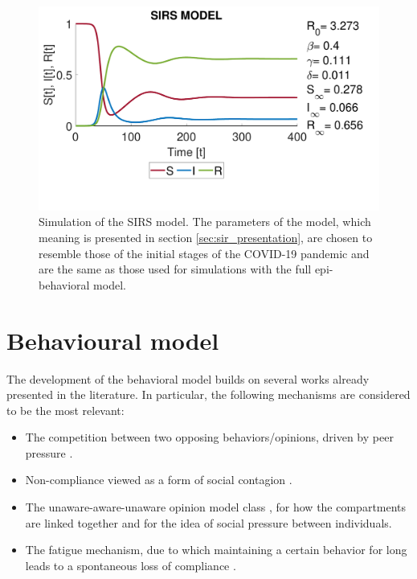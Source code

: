 \begin{figure}[ht]
	\centering
	\includegraphics[width=0.6\linewidth]{1_corpo/figure/r0/sirs_figure}
	\caption[SIRS simulation]{Simulation of the SIRS model. The parameters of the model, which meaning is presented in section \ref{sec:sir_presentation}, are chosen to resemble those of the initial stages of the COVID-19 pandemic \cite{data_R0_covid} and are the same as those used for simulations with the full epi-behavioral model.}
	\label{fig:sirsfigure}
\end{figure}

\section{Behavioural model}
\label{sec:behavioral_model}

The development of the behavioral model builds on several works already presented in the literature. In particular, the following mechanisms are considered to be the most relevant:
\begin{itemize}
	\item The competition between two opposing behaviors/opinions, driven by peer pressure \cite{Epstein_2021}.
	\item Non-compliance viewed as a form of social contagion \cite{Bongarti2023}.
	\item The unaware-aware-unaware opinion model class \cite{Zuo2022, Peng2021}, for how the compartments are linked together and for the idea of social pressure between individuals.
	\item The fatigue mechanism, due to which maintaining a certain behavior for long leads to a spontaneous loss of compliance \cite{Epstein_2021}.
\end{itemize}

